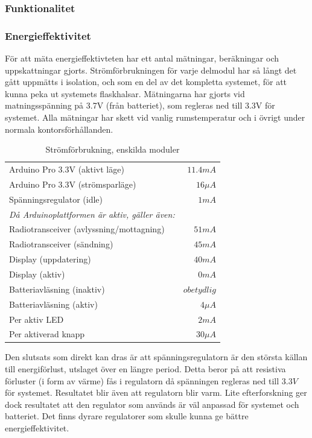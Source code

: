 \documentclass[a4paper,11pt]{article}
\begin{document}
\subsubsection{Funktionalitet}

\subsubsection{Energieffektivitet}
För att mäta energieffektivteten har ett antal mätningar, beräkningar och uppskattningar gjorts. Strömförbrukningen för varje delmodul har så långt det gått uppmätts i isolation, och som en del av det kompletta systemet, för att kunna peka ut systemets flaskhalsar. Mätningarna har gjorts vid matningsspänning på 3.7V (från batteriet), som regleras ned till 3.3V för systemet. Alla mätningar har skett vid vanlig rumstemperatur och i övrigt under normala kontorsförhållanden.

\begin{table}[h]
\centering
	\begin{tabular}{|l|r|}
	Arduino Pro 3.3V (aktivt läge) & {$11.4 mA$}\\
	Arduino Pro 3.3V (strömsparläge) & {$16 {\mu}A$}\\
	Spänningsregulator (idle) & {$1 mA$}\\
	{\it Då Arduinoplattformen är aktiv, gäller även:} & { }\\	
	Radiotransceiver (avlyssning/mottagning) & {$51 mA$}\\
	Radiotransceiver (sändning) & {$45 mA$}\\
	Display (uppdatering) & {$40 mA$}\\
	Display (aktiv) &  {$0 mA$}\\
	Batteriavläsning (inaktiv) & {$obetydlig$}\\
	Batteriavläsning (aktiv) & {$4 {\mu}A$}\\
	Per aktiv LED & {$2 mA$}\\
	Per aktiverad knapp & {$30 {\mu}A$}\\
	\end{tabular}
\caption{Strömförbrukning, enskilda moduler}
\label{tab:currentdrawtable}
\end{table}

Den slutsats som direkt kan dras är att spänningsregulatorn är den största källan till energiförlust, utslaget över en längre period. Detta beror på att resistiva förluster (i form av värme) fås i regulatorn då spänningen regleras ned till $3.3V$ för systemet. Resultatet blir även att regulatorn blir varm. Lite efterforskning ger dock resultatet att den regulator som används är väl anpassad för systemet och batteriet. Det finns dyrare regulatorer som skulle kunna ge bättre energieffektivitet. \\
\end{document}
